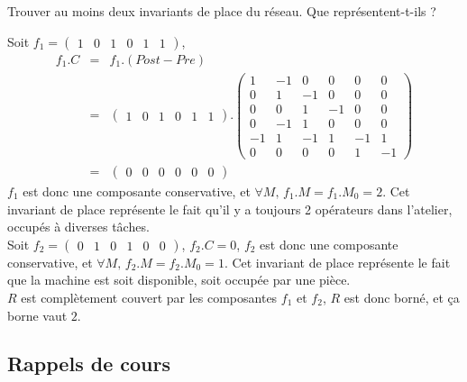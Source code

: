 \documentclass[a4paper]{article}
\begin{document}
\begin{questions}
\question Trouver au moins deux invariants de place du réseau. Que représentent-t-ils ? 

\begin{correction}{.8}
Soit $f_1 = \begin{pmatrix} 1 & 0 & 1 & 0 & 1 & 1\end{pmatrix}$,
\begin{eqnarray*}
f_1 . C &=& f_1 . (Post - Pre)\\
	&=& \begin{pmatrix} 1 & 0 & 1 & 0 & 1 & 1\end{pmatrix} . \begin{pmatrix}
		1 & -1 & 0 & 0 & 0 & 0 \\ %
		0 & 1 & -1 & 0 & 0 & 0 \\ %
		0 & 0 & 1 & -1 & 0 & 0 \\ %
		0 & -1 & 1 & 0 & 0 & 0 \\ %
		-1 & 1 & -1 & 1 & -1 & 1 \\ %
		0 & 0 & 0 & 0 & 1 & -1    %
		\end{pmatrix}\\
	&=& \begin{pmatrix} 0 & 0 & 0 & 0 & 0 & 0\end{pmatrix}
\end{eqnarray*}
$f_1$ est donc une composante conservative, et $\forall M, \, f_1 . M = f_1 . M_0 = 2$.
Cet invariant de place représente le fait qu'il y a toujours 2 opérateurs dans l'atelier, occupés à diverses tâches.\\

Soit $f_2 = \begin{pmatrix}0 & 1 & 0 & 1 & 0 & 0\end{pmatrix}$, $f_2 . C = 0 $, $f_2$ est donc une 
composante conservative, et $\forall M, \, f_2 . M = f_2 . M_0 = 1$.
Cet invariant de place représente le fait que la machine est soit disponible, soit occupée par une pièce.\\

$R$ est complètement couvert par les composantes $f_1$ et $f_2$, $R$ est donc borné, et ça borne vaut $2$.
\end{correction}

\end{questions}

\subsection*{Rappels de cours}
\end{document}
